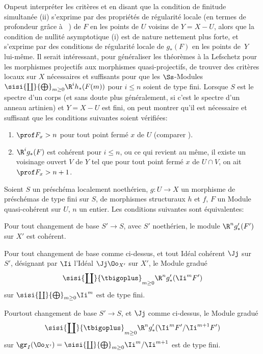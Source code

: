 \begin{remarque} \label{XII.5.6}
On\pageoriginale peut interpr\'eter les crit\`eres  et  en disant que la \og condition de finitude simultan\'ee\fg {} (ii) s'exprime par des propri\'et\'es de r\'egularit\'e locale (en termes de profondeur gr\^ace \`a ~) de $F$ en les points de $U$ voisins de $Y=X- U$, alors que la \og condition de nullit\'e asymptotique\fg {} (i) est de nature nettement plus forte, et s'exprime par des conditions de r\'egularit\'e locale de $g_\ast(F)$ en les points de~$Y$ lui-m\^eme. Il serait int\'eressant, pour g\'en\'eraliser les th\'eor\`emes \`a la Lefschetz pour les morphismes projectifs aux morphismes quasi-projectifs, de trouver des crit\`eres locaux sur $X$ n\'ecessaires et suffisants pour que les $\Ss$-Modules $\sisi{\coprod}{\bigoplus}_{m\geq 0} \R^ih_\ast(F(m))$ pour $i\leq n$ soient de type fini. Lorsque $S$ est le spectre d'un corps (et sans doute plus g\'en\'eralement, si c'est le spectre d'un anneau artinien) et $Y=X- U$ est fini, on peut montrer qu'il est n\'ecessaire et suffisant que les conditions suivantes soient v\'erifi\'ees:
\begin{enumerate}
\item[\textup{1\noo)}] $\prof F_x >n$ pour tout point ferm\'e $x$ de $U$ (comparer ).
\item[\textup{2\noo)}] $\R^ig_\ast(F)$ est coh\'erent pour $i\leq n$, ou ce qui revient au m\^eme, il existe un voisinage ouvert $V$ de $Y$ tel que pour tout point ferm\'e $x$ de $U\cap V$, on ait $\prof F_x >n+1$.
\end{enumerate}
\end{remarque}

\begin{proposition} \label{XII.5.7}
Soient $S$ un pr\'esch\'ema localement noeth\'erien, $g:U\to X$ un morphisme de pr\'esch\'emas de type fini sur $S$, de morphismes structuraux $h$ et $f$, $F$ un Module quasi-coh\'erent sur $U$, $n$ un entier. Les conditions suivantes sont \'equivalentes:
\begin{enumeratei}
\item
Pour tout changement de base $S'\to S$, avec $S'$ noeth\'erien, le module $\R^ng'_\ast(F')$ sur $X'$ est coh\'erent.
\item
Pour tout changement de base comme ci-dessus, et tout Id\'eal coh\'erent $\Jj$ sur~$S'$, d\'esignant par $\Ii$ l'Id\'eal $\Jj\Oo_{X'}$ sur $X'$, le Module gradu\'e
\[
\sisi{\coprod}{\tbigoplus}_{m\geq 0} \R^ng'_\ast(\Ii^mF')
\]
sur $\sisi{\coprod}{\bigoplus}_{m\geq 0} \Ii^m$ est de type fini.
\item
Pour\pageoriginale tout changement de base $S'\to S$, et $\Jj$ comme ci-dessus, le Module gradu\'e
\[
\sisi{\coprod}{\tbigoplus}_{m\geq 0} \R^ng'_\ast(\Ii^mF'/\Ii^{m+1}F')
\]
sur $\gr_I(\Oo_{X'})=\sisi{\coprod}{\bigoplus}_{m\geq 0} \Ii^m/\Ii^{m+1}$ est de type fini.
\end{enumeratei}
\end{proposition}

